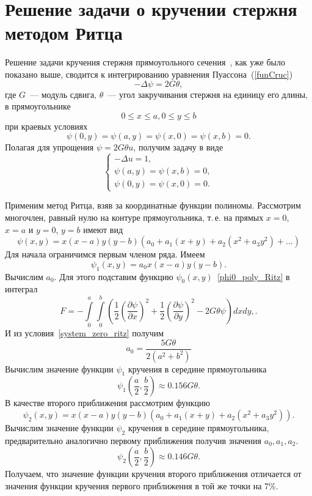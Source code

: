 \documentclass[12pt, a4paper]{article}
\begin{document}
\section{Решение задачи о кручении стержня методом Ритца}
Решение задачи кручения стержня прямоугольного сечения~\cite{Michilin}, как уже было показано выше,  сводится к интегрированию уравнения Пуассона~(\ref{funCruc})
 \[
-\Delta \psi = 2G \theta,
\]
где $G$~--- модуль сдвига, $\theta$~--- угол закручивания стержня на единицу
его длины, в прямоугольнике
\[
0 \leqslant x \leqslant a, 0 \leqslant y \leqslant b
\]
при краевых условиях
\[
\psi(0, y) = \psi(a, y) = \psi(x, 0) = \psi(x, b) = 0.
\]
Полагая для упрощения $\psi = 2G \theta u$, получим задачу в виде
\[
	\begin{cases}
	-\Delta u = 1, \\
	\psi(a, y) =  \psi(x,b) = 0, \\
	\psi(0, y) =  \psi(x,0) = 0.
	\end{cases}
\]

Применим метод Ритца, взяв за координатные функции полиномы.
Рассмотрим многочлен, равный нулю на контуре прямоугольника, т.\,е. на прямых $x = 0$, $x = a$  и $y = 0$, $y = b$ имеют вид
\[
	\psi(x, y) = x(x - a)y(y - b)\left(a_0 + a_1\left(x + y\right) + a_2\left(x^2 + a_3 y^2\right) + \ldots\right)
\]
Для начала ограничимся первым членом ряда. Имеем
\begin{equation}\label{phi0_poly_Ritz}
	\psi_1(x, y) = a_0 x(x - a)y(y - b).
\end{equation}
Вычислим $a_0$.
Для этого подставим функцию $\psi_0(x, y)$~\eqref{phi0_poly_Ritz} в интеграл 
\begin{equation}\label{phi0_int}
	F = - \int\limits_0^a \int\limits_0^b \left(
	\frac{1}{2}
	\left(\frac{\partial\psi}{\partial x}\right)^2 + 
	\frac{1}{2}
	\left(\frac{\partial\psi}{\partial y}\right)^2
	-2G\theta\psi
	 \right) dx dy,.
\end{equation}
И из условия~\eqref{system_zero_ritz}
получим
\[
	a_0 = \frac{5 G \theta}{2(a^2 + b^2)}
\]
Вычислим значение функции $\psi_1$ кручения в середине прямоугольника
\[
	\psi_1\left(\frac{a}{2}, \frac{b}{2}\right) \approx 0.156 G \theta.
\]
В качестве второго приближения рассмотрим функцию
\begin{equation}\label{u_3_poly_Ritz}
	\psi_2(x, y) = x(x - a)y(y - b)\left(a_0 + a_1\left(x + y\right) + a_2\left(x^2 + a_3 y^2\right)\right).
\end{equation}
Вычислим значение функции $\psi_2$ кручения в середине прямоугольника, предварительно аналогично первому приближения получив значения $a_0, a_1, a_2$.
\[
\psi_2\left(\frac{a}{2}, \frac{b}{2}\right) \approx 0.146 G \theta.
\]
Получаем, что значение функции кручения второго приближения отличается от значения функции кручения первого приближения в той же точки на 7\%.
\end{document}
